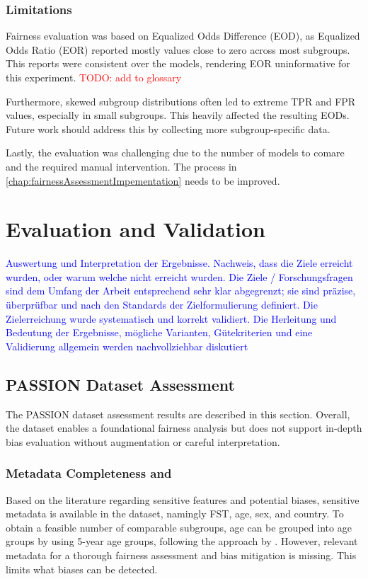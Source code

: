 \documentclass[12pt, a4paper, oneside]{book}   	%
\renewcommand{\todo}[1]{\textcolor{red}{TODO: #1}}
\newcommand{\baaCriteria}[1]{\textcolor{blue}{#1}}
\begin{document}
		\subsection{Limitations}
		Fairness evaluation was based on Equalized Odds Difference (EOD), as Equalized Odds Ratio (EOR) reported mostly values close to zero across most subgroups. This reports were consistent over the models, rendering EOR uninformative for this experiment. \todo{add to glossary}
		
		Furthermore, skewed subgroup distributions often led to extreme \gls{TPR} and \gls{FPR} values, especially in small subgroups. This heavily affected the resulting EODs. Future work should address this by collecting more subgroup-specific data.
		
		Lastly, the evaluation was challenging due to the number of models to comare and the required manual intervention. The process in \autoref{chap:fairnessAssessmentImpementation} needs to be improved.
		
		
	\chapter{Evaluation and Validation}
		\baaCriteria{Auswertung und Interpretation der Ergebnisse. Nachweis, dass die Ziele erreicht wurden, oder warum	welche nicht erreicht wurden.}
		\baaCriteria{Die Ziele / Forschungsfragen sind dem Umfang der Arbeit entsprechend sehr klar abgegrenzt; sie sind präzise, überprüfbar und nach den Standards der Zielformulierung definiert. Die Zielerreichung wurde systematisch und korrekt validiert.}
		\baaCriteria{Die Herleitung und Bedeutung der Ergebnisse, mögliche Varianten, Gütekriterien und eine Validierung allgemein werden nachvollziehbar diskutiert}
		
		
		\section{PASSION Dataset Assessment}
		The PASSION dataset assessment results are described in this section.
		Overall, the dataset enables a foundational fairness analysis but does not support in-depth bias evaluation without augmentation or careful interpretation.
		
		\subsection{Metadata Completeness and } \label{chap:datasetAssessmentMetadataEvaluation}
		Based on the literature regarding sensitive features and potential biases, sensitive metadata is available in the dataset, namingly \gls{FST}, age, sex, and country. To obtain a feasible number of comparable subgroups, age can be grouped into age groups by using 5-year age groups, following the approach by \textcite{Gottfrois2024}.
		However, relevant metadata for a thorough fairness assessment and bias mitigation is missing. This limits what biases can be detected.
		
\end{document}
